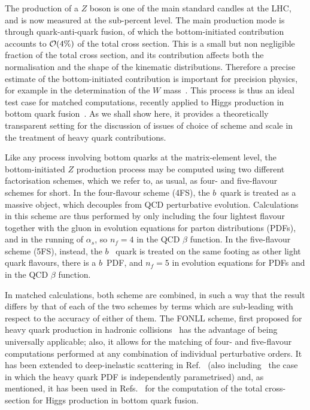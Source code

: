 \documentclass[12pt]{article}
\begin{document}
\pagebreak


The production of a $Z$ boson is one of the main standard candles at the LHC,
and is now measured at the sub-percent level. The main production mode
is through quark-anti-quark fusion, of which the bottom-initiated contribution
accounts to ${\cal O}(4\%)$ of the total cross section.
This is  a small but non negligible fraction of the total cross
section, and
its contribution affects both the normalisation and the shape
of the kinematic distributions.  Therefore a precise estimate of the
bottom-initiated contribution is important for precision physics, for
example in the determination of the $W$ mass~\cite{Bagnaschi:2018dnh}.
This process is thus an ideal test case for matched computations,
recently applied to Higgs production 
in bottom quark
fusion~\cite{Forte:2015hba,Forte:2016sja,Bonvini:2015pxa,Bonvini:2016fgf}. As
we shall show here, it  provides a theoretically transparent setting
for the discussion of issues of  choice of scheme and scale in  the
treatment of heavy quark contributions.

Like any process involving bottom quarks at the matrix-element level, 
the bottom-initiated $Z$ production process 
may be computed using two different  factorisation schemes, which we
refer to, as usual, as four- and five-flavour schemes for short. In the
four-flavour scheme (4FS), the $b$~quark is treated as a massive
object, which 
decouples from QCD perturbative evolution. Calculations in this scheme
are thus performed by only including
the four lightest flavour together with the gluon  in evolution
equations for parton distributions (PDFs), and in the running of
$\alpha_s$,
so $n_f=4$ in the QCD $\beta$ function.
In the five-flavour scheme (5FS), instead, the $b$~ quark is treated on
the same footing as other light quark flavours, there is a $b$~PDF, and
$n_f=5$ in evolution equations for PDFs and in the QCD $\beta$ function.

In matched calculations, both scheme are combined, in such a way that
the result differs by that of each of the two schemes by terms which
are sub-leading with respect to the accuracy of either of them. 
The FONLL scheme,
first proposed for  heavy quark production in hadronic
collisions~\cite{Cacciari:1998it} has the advantage of being
universally applicable; also, it allows for the matching of
four- and five-flavour computations performed at any combination of
individual perturbative orders. It has been extended to deep-inelastic
scattering in Ref.~\cite{Forte:2010ta} (also
including~\cite{Ball:2015tna,Ball:2015dpa} the case in which the heavy
quark PDF is independently parametrised) and, as mentioned, it has
been
used in
Refs.~\cite{Forte:2015hba,Forte:2016sja} for the computation of the
total cross-section for Higgs production in bottom
quark fusion.
\end{document}
